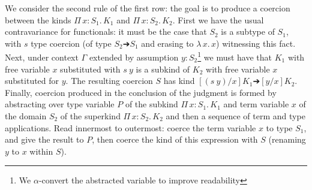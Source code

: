 \documentclass{article}
\newcommand{\ann}[2]{#1\! : \! #2}
\newcommand{\abs}[4]{{#1}\, #2\! : \! #3.\, #4}
\newcommand{\absu}[3]{{#1}\, #2.\, #3}
\begin{document}
We consider the second rule of the first row: the goal is to produce a coercion
between the kinds \(\abs{Π}{x}{S_1}{K_1}\) and \(\abs{Π}{x}{S_2}{K_2}\). First
we have the usual contravariance for functionals: it must be the case that $S_2$
is a subtype of $S_1$, with $s$ type coercion (of type $S_2 ➔ S_1$ and erasing
to $\absu{λ}{x}{x}$) witnessing this fact. Next, under context $\Gamma$ extended
by assumption $\ann{y}{S_2}$\footnote{We $\alpha$-convert the abstracted
  variable to improve readability} we must have that $K_1$ with free variable
$x$ substituted with $s\ y$ is a subkind of $K_2$ with free variable $x$
substituted for $y$. The resulting coercion $S$ has kind $[(s\ y)/x]K_1 ➔
[y/x]K_2$. Finally, coercion produced in the conclusion of the judgment is
formed by abstracting over type variable $P$ of the subkind
\(\abs{Π}{x}{S_1}{K_1}\) and term variable $x$ of the domain $S_2$ of the
superkind \(\abs{Π}{x}{S_2}{K_2}\) and then a sequence of term and type
applications. Read innermost to outermost: coerce the term variable $x$ to type
$S_1$, and give the result to $P$, then coerce the kind of this expression with
$S$ (renaming $y$ to $x$ within $S$).

\newpage
\end{document}
